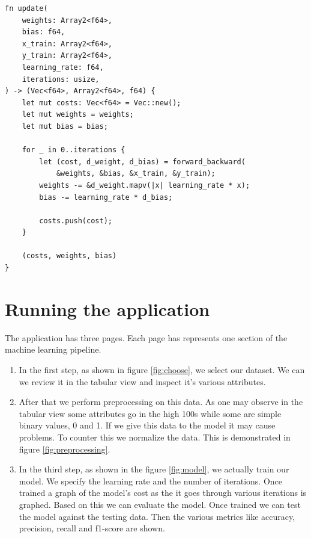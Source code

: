 \documentclass[12pt, a4]{article}
\begin{document}
\begin{verbatim}
fn update(
    weights: Array2<f64>,
    bias: f64,
    x_train: Array2<f64>,
    y_train: Array2<f64>,
    learning_rate: f64,
    iterations: usize,
) -> (Vec<f64>, Array2<f64>, f64) {
    let mut costs: Vec<f64> = Vec::new();
    let mut weights = weights;
    let mut bias = bias;

    for _ in 0..iterations {
        let (cost, d_weight, d_bias) = forward_backward(
            &weights, &bias, &x_train, &y_train);
        weights -= &d_weight.mapv(|x| learning_rate * x);
        bias -= learning_rate * d_bias;

        costs.push(cost);
    }

    (costs, weights, bias)
}
\end{verbatim}

\section{Running the application}

The application has three pages. Each page has represents one section of the
machine learning pipeline.

\begin{enumerate}
  \item{In the first step, as shown in figure \ref{fig:choose}, we select our
        dataset. We can we review it in the tabular view and inspect it's
        various attributes.}
  \item{After that we perform preprocessing on this data. As one may observe
        in the tabular view some attributes go in the high 100s while some
        are simple binary values, 0 and 1. If we give this data to the model
        it may cause problems. To counter this we normalize the data. This is
        demonstrated in figure \ref{fig:preprocessing}.}
  \item{In the third step, as shown in the figure \ref{fig:model}, we actually
        train our model. We specify the learning rate and the number of
        iterations. Once trained a graph of the model's cost as the it goes
        through various iterations is graphed. Based on this we can evaluate
        the model. Once trained we can test the model against the testing data.
        Then the various metrics like accuracy, precision, recall and f1-score
        are shown.}
\end{enumerate}
\end{document}
